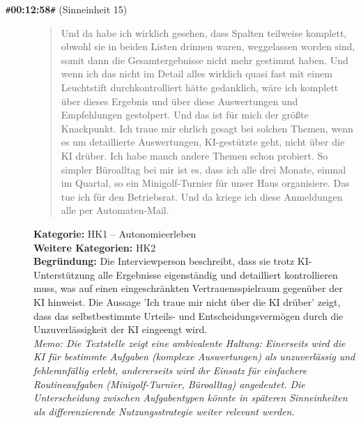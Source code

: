 \begin{description}
  \item[\texttt{\#}\textbf{00:12:58}\texttt{\#} (Sinneinheit 15)]
  \begin{quote}
  Und da habe ich wirklich gesehen, dass Spalten teilweise komplett, obwohl sie in beiden Listen drinnen waren, weggelassen worden sind, somit dann die Gesamtergebnisse nicht mehr gestimmt haben. Und wenn ich das nicht im Detail alles wirklich quasi fast mit einem Leuchtstift durchkontrolliert hätte gedanklich, wäre ich komplett über dieses Ergebnis und über diese Auswertungen und Empfehlungen gestolpert. Und das ist für mich der größte Knackpunkt. Ich traue mir ehrlich gesagt bei solchen Themen, wenn es um detaillierte Auswertungen, KI-gestützte geht, nicht über die KI drüber. Ich habe manch andere Themen schon probiert. So simpler Büroalltag bei mir ist es, dass ich alle drei Monate, einmal im Quartal, so ein Minigolf-Turnier für unser Haus organisiere. Das tue ich für den Betriebsrat. Und da kriege ich diese Anmeldungen alle per Automaten-Mail.
  \end{quote}
  \textbf{Kategorie:} HK1 -- Autonomieerleben\\
  \textbf{Weitere Kategorien:} HK2\\
  \textbf{Begr\"undung:} Die Interviewperson beschreibt, dass sie trotz KI-Unterstützung alle Ergebnisse eigenständig und detailliert kontrollieren muss, was auf einen eingeschränkten Vertrauensspielraum gegenüber der KI hinweist. Die Aussage 'Ich traue mir nicht über die KI drüber' zeigt, dass das selbstbestimmte Urteils- und Entscheidungsvermögen durch die Unzuverlässigkeit der KI eingeengt wird.
  \\\textit{Memo: Die Textstelle zeigt eine ambivalente Haltung: Einerseits wird die KI für bestimmte Aufgaben (komplexe Auswertungen) als unzuverlässig und fehleranfällig erlebt, andererseits wird ihr Einsatz für einfachere Routineaufgaben (Minigolf-Turnier, Büroalltag) angedeutet. Die Unterscheidung zwischen Aufgabentypen könnte in späteren Sinneinheiten als differenzierende Nutzungsstrategie weiter relevant werden.}
\end{description}
\medskip


